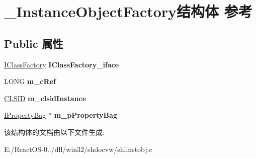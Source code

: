 \hypertarget{struct___instance_object_factory}{}\section{\+\_\+\+Instance\+Object\+Factory结构体 参考}
\label{struct___instance_object_factory}
\subsection*{Public 属性}
\begin{DoxyCompactItemize}
\item 
\mbox{\label{struct___instance_object_factory_afd4b0926ab9ae3c15e9dccefbe0c47fb}} 
\hyperlink{interface_i_class_factory}{I\+Class\+Factory} {\bfseries I\+Class\+Factory\+\_\+iface}
\item 
\mbox{\label{struct___instance_object_factory_afc054be5f7138fd3cff9c924a31f1ba5}} 
L\+O\+NG {\bfseries m\+\_\+c\+Ref}
\item 
\mbox{\label{struct___instance_object_factory_ad8901059fb5f8cb587d98c8dfe9fbea9}} 
\hyperlink{struct___i_i_d}{C\+L\+S\+ID} {\bfseries m\+\_\+clsid\+Instance}
\item 
\mbox{\label{struct___instance_object_factory_a75f5e343685a0f868a9d6d22c9ccd1d5}} 
\hyperlink{interface_i_property_bag}{I\+Property\+Bag} $\ast$ {\bfseries m\+\_\+p\+Property\+Bag}
\end{DoxyCompactItemize}


该结构体的文档由以下文件生成\+:\begin{DoxyCompactItemize}
\item 
E\+:/\+React\+O\+S-\/0../dll/win32/shdocvw/shlinstobj.\+c\end{DoxyCompactItemize}
